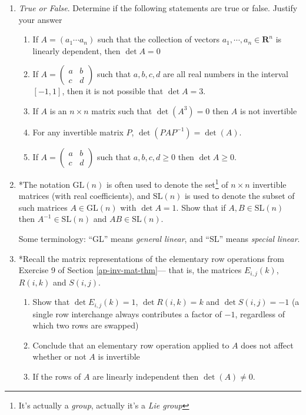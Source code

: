 \documentclass[12pt]{article}
\numberwithin{equation}{subsection}
\numberwithin{figure}{subsection}
\theoremstyle{note}
\newcommand\GL[1]{\mathrm{GL}(#1)}
\newcommand\SL[1]{\mathrm{SL}(#1)}
\begin{document}
\begin{enumerate}[label=\arabic*.]
\begin{enumerate}
\end{enumerate}

\item \textit{True or False}. Determine if the following statements are true or false. Justify your answer
\begin{enumerate}
	\item If $A=(a_1 \cdots a_n)$ such that the collection of vectors $a_1, \cdots, a_n\in\mathbf{R}^n$ is linearly dependent, then $\det A=0$
	\item If $A=\begin{pmatrix} a & b \\ c & d\end{pmatrix}$ such that $a,b,c,d$ are all real numbers in the interval $[-1,1]$, then it is not possible that $\det A=3$. 
	\item If $A$ is an $n\times n$ matrix such that $\det(A^3)=0$ then $A$ is not invertible
	\item For any invertible matrix $P$, $\det(PAP^{-1})=\det(A)$. 
	\item If $A=\begin{pmatrix} a & b \\ c & d\end{pmatrix}$ such that $a,b,c,d\geq 0$ then $\det A\geq 0$.
	\end{enumerate}

\item *The notation $\GL{n}$ is often used to denote the set\footnote{It's actually a \textit{group}, actually it's a \textit{Lie group}} of $n\times n$ invertible matrices (with real coefficients), and $\SL{n}$ is used to denote the subset of such matrices $A\in \GL{n}$ with $\det A=1$. Show that if $A,B\in \SL{n}$ then $A^{-1}\in \SL{n}$ and $AB\in \SL{n}$. 

Some terminology:  ``GL'' means \textit{general linear}, and ``SL'' means \textit{special linear}.

\item *Recall the matrix representations of the elementary row operations from Exercise 9 of Section \ref{ap-inv-mat-thm}--- that is, the matrices $E_{i,j}(k)$, $R(i,k)$ and $S(i,j)$. 
\begin{enumerate}
	\item Show that $\det E_{i,j}(k)=1$, $\det R(i,k)=k$ and $\det S(i,j)=-1$ (a single row interchange always contributes a factor of $-1$, regardless of which two rows are swapped)
	\item Conclude that an elementary row operation applied to $A$ does not affect whether or not $A$ is invertible 
	\item If the rows of $A$ are linearly independent then $\det(A)\neq 0$.
	\end{enumerate}
\end{enumerate}
\end{document}
